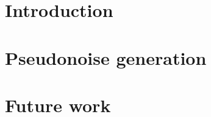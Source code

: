 \documentclass{tfg_domingo}
\begin{document}

\portada
\frontmatter
\gracias{}
\resumen{}{}
\tableofcontents

\mainmatter


\chapter{Introduction}



\chapter{Pseudonoise generation}











\chapter{Future work}
\end{document}
